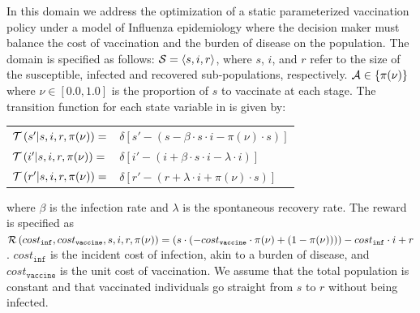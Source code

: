 In this domain we address the optimization of a static parameterized vaccination policy under a model of Influenza epidemiology where the decision maker must balance the cost of vaccination and the burden of disease on the population. The domain is specified as follows: {\footnotesize $ \mathcal{S} = \left\langle s, i, r \right\rangle$}, where $ s $, $ i $, and $ r $ refer to the size of the susceptible, infected and recovered sub-populations, respectively. {\footnotesize $ \mathcal{A} \in \left\lbrace \pi(\nu) \right\rbrace $} where {\footnotesize $\nu \in \left[0.0, 1.0\right]$} is the proportion of $ s $ to vaccinate at each stage. The transition function {\footnotesize \Transition} for each state variable in {\footnotesize \State} is given by:
    {\footnotesize 
        \abovedisplayskip=5pt
        \belowdisplayskip=0pt
        \renewcommand{\arraystretch}{1.5}
        \begin{tabular}{ll}
            $ \mathcal{T}\left( s' | s, i, r, \pi(\nu) \right) =$ & $ \delta \left[ s' - (s - \beta \cdot s \cdot i - \pi(\nu) \cdot s) \right] $ \\
            $ \mathcal{T}\left( i' | s, i, r, \pi(\nu) \right) =$ & $ \delta \left[ i' - (i + \beta \cdot s \cdot i - \lambda \cdot i) \right] $ \\
            $ \mathcal{T}\left( r' | s, i, r, \pi(\nu) \right) =$ & $ \delta \left[ r' - (r + \lambda \cdot i + \pi(\nu) \cdot s) \right] $ \\            
        \end{tabular}
    }%
where {\footnotesize $ \beta $} is the infection rate and {\footnotesize $\lambda$} is the spontaneous recovery rate. The reward is specified as {\footnotesize $ \mathcal{R}\left(cost_{\mathtt{inf}}, cost_{\mathtt{vaccine}}, s, i, r, \pi(\nu) \right) = (s \cdot (-cost_{\mathtt{vaccine}} \cdot \pi(\nu) + (1 - \pi(\nu)))) - cost_{\mathtt{inf}} \cdot i + r$}. {\footnotesize $ cost_{\mathtt{inf}} $} is the incident cost of infection, akin to a burden of disease, and {\footnotesize $ cost_{\mathtt{vaccine}} $} is the unit cost of vaccination. We assume that the total population is constant and that vaccinated individuals go straight from {\footnotesize $ s $} to {\footnotesize $ r $} without being infected. 


